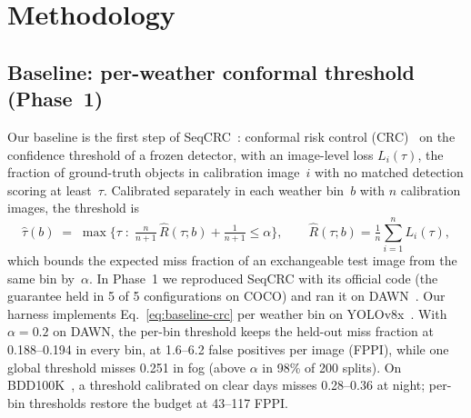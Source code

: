\section{Methodology}\label{sec:method}

\subsection{Baseline: per-weather conformal threshold (Phase~1)}\label{sec:method-baseline}

Our baseline is the first step of SeqCRC~\citep{andeol2025seqcrc}: conformal risk control
(CRC)~\citep{angelopoulos2024crc} on the confidence threshold of a frozen detector, with an image-level loss
$L_i(\tau)$, the fraction of ground-truth objects in calibration image~$i$ with no matched detection scoring at
least~$\tau$. Calibrated separately in each weather bin~$b$ with $n$ calibration images, the threshold is
\begin{equation}
  \hat\tau(b) \;=\; \max\Big\{\tau \;:\; \tfrac{n}{n+1}\,\hat R(\tau; b) + \tfrac{1}{n+1} \le \alpha\Big\},
  \qquad \hat R(\tau; b) = \tfrac{1}{n}\textstyle\sum_{i=1}^{n} L_i(\tau),
  \label{eq:baseline-crc}
\end{equation}
which bounds the expected miss fraction of an exchangeable test image from the same bin by~$\alpha$.
In Phase~1 we reproduced SeqCRC with its official code (the guarantee held in 5 of 5 configurations on COCO)
and ran it on DAWN~\citep{kenk2020dawn}. Our harness implements Eq.~\eqref{eq:baseline-crc} per weather bin on
YOLOv8x~\citep{ultralytics2023yolov8}. With $\alpha = 0.2$ on DAWN, the per-bin threshold keeps the held-out miss
fraction at 0.188--0.194 in every bin, at 1.6--6.2 false positives per image (FPPI), while one global threshold
misses 0.251 in fog (above $\alpha$ in 98\% of 200 splits). On BDD100K~\citep{yu2020bdd100k}, a threshold
calibrated on clear days misses 0.28--0.36 at night; per-bin thresholds restore the budget at 43--117 FPPI.


